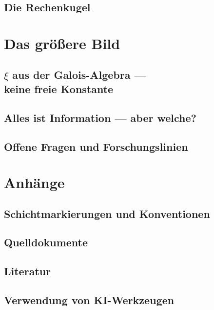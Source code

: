 \documentclass[11pt,twoside,openright]{book}
\theoremstyle{plain}
\theoremstyle{definition}
\begin{document}
\chapter{Die Rechenkugel}


\part{Das größere Bild}

\chapter[xi aus der Galois-Algebra]{$\xi$ aus der Galois-Algebra ---\\
keine freie Konstante}


\chapter[Alles ist Information]{Alles ist Information --- aber welche?}


\chapter{Offene Fragen und Forschungslinien}


\backmatter

\appendix
\part*{Anhänge}

\chapter{Schichtmarkierungen und Konventionen}


\chapter{Quelldokumente}


\chapter{Literatur}


\chapter{Verwendung von KI-Werkzeugen}

\end{document}
